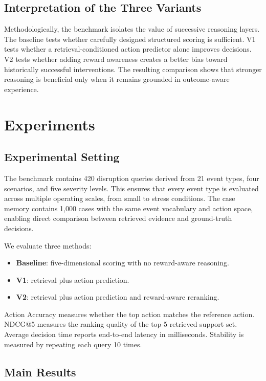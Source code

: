 \documentclass[conference]{IEEEtran}
\begin{document}
\subsection{Interpretation of the Three Variants}

Methodologically, the benchmark isolates the value of successive reasoning layers. The baseline tests whether carefully designed structured scoring is sufficient. V1 tests whether a retrieval-conditioned action predictor alone improves decisions. V2 tests whether adding reward awareness creates a better bias toward historically successful interventions. The resulting comparison shows that stronger reasoning is beneficial only when it remains grounded in outcome-aware experience.

\section{Experiments}
\label{sec:experiments}

\subsection{Experimental Setting}

The benchmark contains 420 disruption queries derived from 21 event types, four scenarios, and five severity levels. This ensures that every event type is evaluated across multiple operating scales, from small to stress conditions. The case memory contains 1,000 cases with the same event vocabulary and action space, enabling direct comparison between retrieved evidence and ground-truth decisions.

We evaluate three methods:
\begin{itemize}
\item \textbf{Baseline}: five-dimensional scoring with no reward-aware reasoning.
\item \textbf{V1}: retrieval plus action prediction.
\item \textbf{V2}: retrieval plus action prediction and reward-aware reranking.
\end{itemize}

Action Accuracy measures whether the top action matches the reference action. NDCG@5 measures the ranking quality of the top-5 retrieved support set. Average decision time reports end-to-end latency in milliseconds. Stability is measured by repeating each query 10 times.

\subsection{Main Results}
\end{document}
